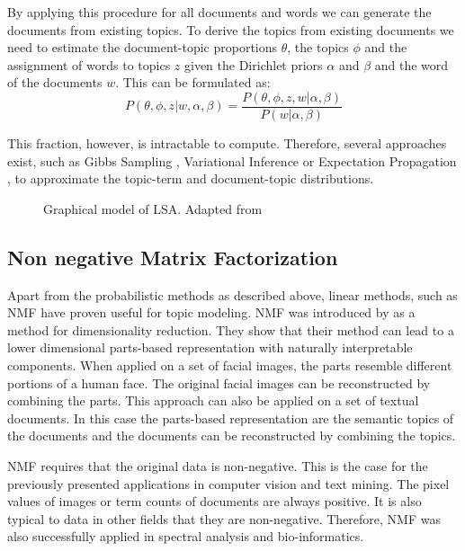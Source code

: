 By applying this procedure for all documents and words we can generate the documents from existing topics. To derive the topics from existing documents we need to estimate the document-topic proportions $\theta$, the topics $\phi$ and the assignment of words to topics $z$ given the Dirichlet priors $\alpha$ and $\beta$ and the word of the documents $w$. This can be formulated as:
\begin{equation}
P(\theta, \phi, z| w, \alpha, \beta) = \frac{P(\theta, \phi, z, w |\alpha, \beta)}{P(w |\alpha, \beta)} 
\end{equation}

This fraction, however, is intractable to compute. Therefore, several approaches exist, such as Gibbs Sampling \citep{Griffiths2002}, Variational Inference \citep{Blei2003} or Expectation Propagation \citep{Minka2002}, to approximate the topic-term and document-topic distributions.

\begin{figure}
	
	\caption[Graphical model of \ac{LDA}]{Graphical model of \ac{LSA}. Adapted from \cite{Widmer2018}}
	\label{fig:dgmlda}
\end{figure}


\subsection{Non negative Matrix Factorization}

Apart from the probabilistic methods as described above, linear methods, such as \acl{NMF} have proven useful for topic modeling. \ac{NMF} was introduced by \cite{Lee1999} as a method for dimensionality reduction. They show that their method can lead to a lower dimensional parts-based representation with naturally interpretable components. When applied on a set of facial images, the parts resemble different portions of a human face. The original facial images can be reconstructed by combining the parts. This approach can also be applied on a set of textual documents. In this case the parts-based representation are the semantic topics of the documents and the documents can be reconstructed by combining the topics.

\ac{NMF} requires that the original data is non-negative. This is the case for the previously presented applications in computer vision and text mining. The pixel values of images or term counts of documents are always positive. It is also typical to data in other fields that they are non-negative. Therefore, \ac{NMF} was also successfully applied in spectral analysis \citep{Pauca2006} and bio-informatics\citep{Brunet2004}.

